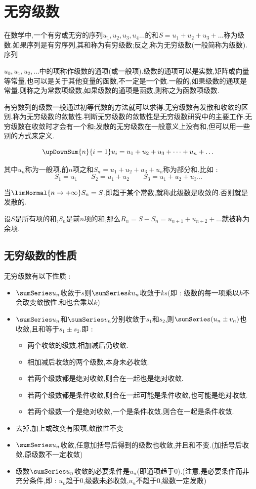 \chapter{无穷级数}{
在数学中,一个有穷或无穷的序列$u_{1},u_{2},u_{3},u_{4}\ldots$的和$S=u_{1}+u_{2}+u_{3}+\ldots$称为级数.如果序列是有穷序列,其和称为有穷级数;反之,称为无穷级数(一般简称为级数).序列{$u_{0},u_{1},u_{2},\ldots$中的项称作级数的通项(或一般项).级数的通项可以是实数,矩阵或向量等常量,也可以是关于其他变量的函数,不一定是一个数.一般的,如果级数的通项是常量,则称之为常数项级数,如果级数的通项是函数,则称之为函数项级数.

有穷数列的级数一般通过初等代数的方法就可以求得.无穷级数有发散和收敛的区别,称为无穷级数的敛散性.判断无穷级数的敛散性是无穷级数研究中的主要工作.无穷级数在收敛时才会有一个和;发散的无穷级数在一般意义上没有和,但可以用一些别的方式来定义.

$$
  \upDownSum{n}{i = 1}u_i = u_1 + u_2 + u_3 + \dots + u_n +  \dots
$$

其中$u_n$称为一般项,前$n$项之和$S_n = u_1 + u_2 + u_3 + u_n$称为部分和,比如 :
$$
  S_1 = u_1\qquad S_2 = u_1 + u_2\qquad S_3 = u_1 + u_2 + u_3 \dots
$$

当$\limNormal{n \to +\infty}S_n = S$,即趋于某个常数,就称此级数是收敛的.否则就是发散的.

设$S$是所有项的和,$S_n$是前$n$项的和,那么$R_n = S - S_n = u_{n+1} + u_{n + 2} + \dots$就被称为余项.

\section{无穷级数的性质}{
  无穷级数有以下性质 :
  \begin{itemize}
    \item $\sumSeries u_n$收敛于$s$则$\sumSeries ku_n$收敛于$ks$(即 : 级数的每一项乘以$k$不会改变敛散性.和也会乘以$k$)
    \item {
          $\sumSeries u_n$和$\sumSeries v_n$分别收敛于$s_1$和$s_2$,则$\sumSeries (u_n \pm v_n)$也收敛,且和等于$s_1 \pm s_2$.即 :
          \begin{itemize}
            \item 两个收敛的级数,相加减后仍收敛.
            \item 相加减后收敛的两个级数,本身未必收敛.
            \item 若两个级数都是绝对收敛,则合在一起也是绝对收敛.
            \item 若两个级数都是条件收敛,则合在一起可能是条件收敛,也可能是绝对收敛.
            \item 若两个级数一个是绝对收敛,一个是条件收敛,则合在一起是条件收敛.
          \end{itemize}
          }
    \item 去掉,加上或改变有限项,敛散性不变
    \item $\sumSeries u_n$收敛,任意加括号后得到的级数也收敛,并且和不变.(加括号后收敛,原级数不一定收敛)
    \item 级数$\sumSeries u_n$收敛的必要条件是$u_n$(即通项趋于0).(注意,是必要条件而非充分条件,即 : $u_n$趋于0,级数未必收敛,$u_n$不趋于0,级数一定发散)
  \end{itemize}
 }%

}}
